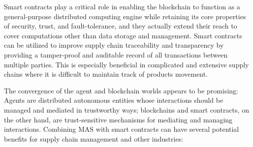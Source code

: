 \vspace{.5cm}

Smart contracts play a critical role in enabling the blockchain to function as a general-purpose distributed computing engine while retaining its core properties of security, trust, and fault-tolerance, and they actually extend their reach to cover computations other than data storage and management. Smart contracts can be utilized to improve supply chain traceability and transparency by providing a tamper-proof and auditable record of all transactions between multiple parties. This is especially beneficial in complicated and extensive supply chains where it is difficult to maintain track of products movement.

\vspace{.5cm}
The convergence of the agent and blockchain worlds appears to be promising: Agents are distributed autonomous entities whose interactions should be managed and mediated in trustworthy ways; blockchains and smart contracts, on the other hand, are trust-sensitive mechanisms for mediating and managing interactions. Combining \ac{MAS} with smart contracts can have several potential benefits for supply chain management and other industries:

